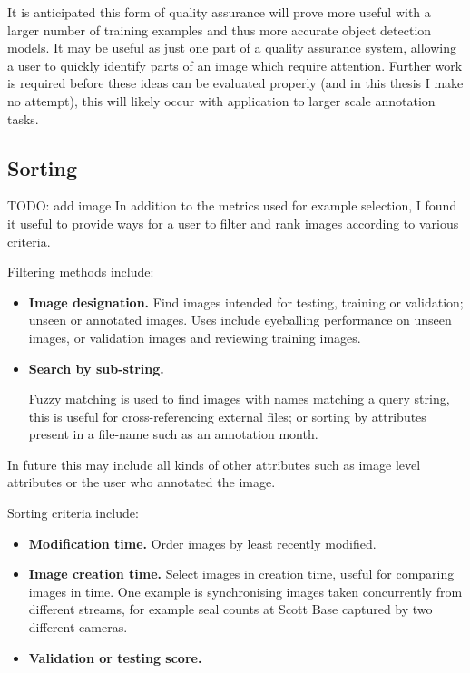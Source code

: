 It is anticipated this form of quality assurance will prove more useful with a larger number of training examples and thus more accurate object detection models. It may be useful as just one part of a quality assurance system, allowing a user to quickly identify parts of an image which require attention. Further work is required before these ideas can be evaluated properly (and in this thesis I make no attempt), this will likely occur with application to larger scale annotation tasks.

\subsection {Sorting}

TODO: add image
In addition to the metrics used for example selection, I found it useful to provide ways for a user to filter and rank images according to various criteria.

Filtering methods include:

\begin{itemize}
    \item {\bf Image designation.}
Find images intended for testing, training or validation; unseen or annotated images. Uses include eyeballing performance on unseen images, or validation images and reviewing training images.

\item {\bf Search by sub-string.}

Fuzzy matching is used to find images with names matching a query string, this is useful for cross-referencing external files; or sorting by attributes present in a file-name such as an annotation month.

\end{itemize}

In future this may include all kinds of other attributes such as image level attributes or the user who annotated the image.

Sorting criteria include:

\begin{itemize}
    \item {\bf Modification time.}
Order images by least recently modified.
    \item {\bf Image creation time. }
Select images in creation time, useful for comparing images in time. One example is synchronising images taken concurrently from different streams, for example seal counts at Scott Base captured by two different cameras.
    \item {\bf Validation or testing score. }


\end{itemize}



